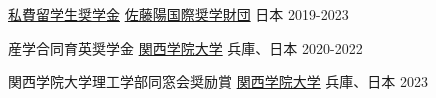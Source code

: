 
\begin{cvhonors}

  \cvhonor
    {\href{https://sisf.or.jp/ja/scholarship/foreign-studies/self-supporting/}{私費留学生奨学金}} %
    {\href{https://sisf.or.jp/ja/}{佐藤陽国際奨学財団}} %
    {日本} %
    {2019-2023} %

  \cvhonor
    {産学合同育英奨学金} %
    {\href{https://www.kwansei.ac.jp/index.html}{関西学院大学}} %
    {兵庫、日本} %
    {2020-2022} %

  \cvhonor
    {関西学院大学理工学部同窓会奨励賞} %
    {\href{https://www.kwansei.ac.jp/index.html}{関西学院大学}} %
    {兵庫、日本} %
    {2023} %

\end{cvhonors}
